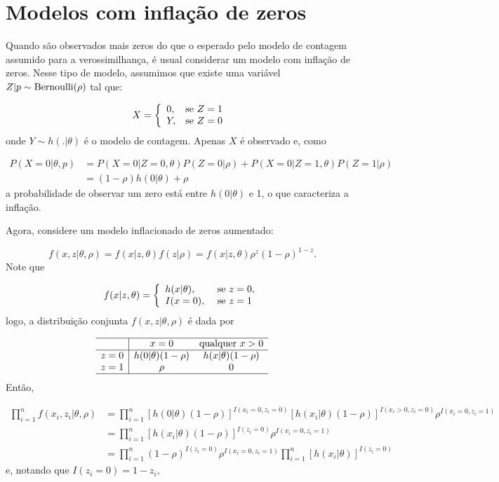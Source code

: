 \documentclass[
  letterpaper,
  DIV=11,
  numbers=noendperiod]{scrreprt}
\theoremstyle{definition}
\theoremstyle{definition}
\theoremstyle{remark}
\begin{document}
\hypertarget{modelos-com-inflauxe7uxe3o-de-zeros}{%
\section{Modelos com inflação de
zeros}\label{modelos-com-inflauxe7uxe3o-de-zeros}}

Quando são observados mais zeros do que o esperado pelo modelo de
contagem assumido para a verossimilhança, é usual considerar um modelo
com inflação de zeros. Nesse tipo de modelo, assumimos que existe uma
variável \(Z|p\sim\hbox{Bernoulli}(\rho)\) tal que:

\[X=\left\{\begin{array}{ll}0, & \hbox{se }Z=1\ \\ Y,&\hbox{se }Z=0\end{array}\right.\]
onde \(Y\sim h(.|\theta)\) é o modelo de contagem. Apenas \(X\) é
observado e, como

\[\begin{align}P(X=0|\theta,p)&=P(X=0|Z=0,\theta)P(Z=0|\rho)+P(X=0|Z=1,\theta)P(Z=1|\rho)\\&=(1-\rho)h(0|\theta)+\rho\end{align}\]
a probabilidade de observar um zero está entre \(h(0|\theta)\) e 1, o
que caracteriza a inflação.

Agora, considere um modelo inflacionado de zeros aumentado:

\[f(x,z|\theta,\rho)=f(x|z,\theta)f(z|\rho)=f(x|z,\theta)\rho^z(1-\rho)^{1-z}.\]
Note que

\[f(x|z,\theta)=\left\{
\begin{array}{ll}
h(x|\theta),&\hbox{ se }z=0,\\
I(x=0),&\hbox{ se }z=1\\
\end{array}\right.\] logo, a distribuição conjunta
\(f(x,z|\theta,\rho)\) é dada por

\[\begin{array}{c|cc}\hline & x=0 & \hbox{qualquer }x> 0 \\ \hline
z=0 & h(0|\theta)(1-\rho) & h(x|\theta)(1-\rho) \\
z=1 & \rho & 0 \\ \hline
\end{array}
\] Então,

\[\begin{align}
\prod_{i=1}^n f(x_i,z_i|\theta,\rho)&=\prod_{i=1}^n [h(0|\theta)(1-\rho)]^{I(x_i=0,z_i=0)}[h(x_i|\theta)(1-\rho)]^{I(x_i>0,z_i=0)}\rho^{I(x_i=0,z_i=1)}\\
&=\prod_{i=1}^n [h(x_i|\theta)(1-\rho)]^{I(z_i=0)}\rho^{I(x_i=0,z_i=1)}\\
&=\prod_{i=1}^n(1-\rho)^{I(z_i=0)}\rho^{I(x_i=0,z_i=1)}\prod_{i=1}^n [h(x_i|\theta)]^{I(z_i=0)}\end{align}\]
e, notando que \(I(z_i=0)=1-z_i,\)
\end{document}
